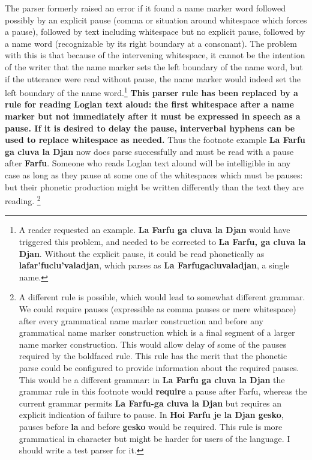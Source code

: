 \documentclass[12pt]{book}
\begin{document}
The parser formerly raised an error if it found a name marker word followed possibly by an explicit pause (comma or situation around whitespace which forces a pause), followed by text including whitespace but no explicit pause, followed by a name word (recognizable by its right boundary at a consonant). The problem with this is that because of the intervening whitespace, it cannot be  the intention of the writer that the name marker sets the left boundary of the name word, but if the utterance were read without pause, the name marker would indeed set the left boundary of the name word.\footnote{A reader requested an example.  {\bf La Farfu ga cluva la Djan} would have triggered this problem, and needed to be corrected to {\bf La Farfu, ga cluva la Djan}.  Without the explicit pause, it could be read phonetically as {\bf lafar'fuclu'valadjan}, which parses as {\bf La Farfugacluvaladjan}, a single name.}  {\bf This parser rule has been replaced by a rule for reading Loglan text aloud:  the first whitespace after a name marker but not immediately after it must be expressed in speech as a pause.  If it is desired to delay the pause, interverbal hyphens can be used to replace whitespace as needed.}  Thus the footnote example {\bf La Farfu ga cluva la Djan} now does parse successfully and must be read with a pause after {\bf Farfu}.  Someone who reads Loglan text alound will be intelligible in any case
as long as they pause at some one of the whitespaces which must be pauses:  but their phonetic production might be written differently than the text they are reading. \footnote{A different rule is possible, which would lead to somewhat different grammar.  We could require pauses (expressible as comma pauses or mere whitespace) after every grammatical name marker construction and before any grammatical name marker construction which is a final segment of a larger name marker construction.  This would allow delay of some of the pauses required by the boldfaced rule.  This rule has the merit that the phonetic parse could be configured to provide information about the required pauses.   This would be a different grammar:  in {\bf La Farfu ga cluva la Djan} the grammar rule in this footnote would {\bf require} a pause after Farfu, whereas the current grammar permits
{\bf La Farfu-ga cluva la Djan} but requires an explicit indication of failure to pause.  In {\bf Hoi Farfu je la Djan gesko},
pauses before {\bf la} and before {\bf gesko} would be required.  This rule is more grammatical in character but might be harder for users of the language.  I should write a test parser for it.}
\end{document}
